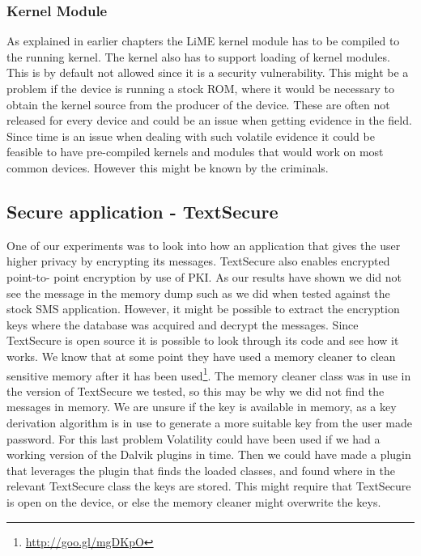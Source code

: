 \subsubsection{Kernel Module}
As explained in earlier chapters the LiME kernel module has to be compiled to the 
running kernel. The kernel also has to support loading of kernel modules. This is 
by default not allowed since it is a security vulnerability. This might be a 
problem if the device is running a stock ROM, where it would be necessary to obtain 
the kernel source from the producer of the device. These are often not released for 
every device and could be an issue when getting evidence in the field. Since time is 
an issue when dealing with such volatile evidence it could be feasible to have 
pre-compiled kernels and modules that would work on most common devices. However 
this might be known by the criminals. %

\subsection{Secure application - TextSecure}
One of our experiments was to look into how an application that gives the user higher 
privacy by encrypting its messages. TextSecure also enables encrypted point-to-
point encryption by use of PKI. As our results have shown we did not see the 
message in the memory dump such as we did when tested against the stock SMS application. 
However, it might be possible to extract the encryption keys where the database was 
acquired and decrypt the messages. Since TextSecure is open source it is
possible to look through its code and see how it works. We know that at some
point they have used a memory cleaner to clean sensitive memory after it has
been used\footnote{\url{http://goo.gl/mgDKpO}}.
The memory cleaner class was in use in the version of TextSecure we tested, so
this may be why we did not find the messages in memory. We are unsure if the
key is available in memory, as a key derivation algorithm is in use to
generate a more suitable key from the user made password. For this last
problem Volatility could have been used if we had a working version of the
Dalvik plugins in time. Then we could have made a plugin that leverages the
plugin that finds the loaded classes, and found where in the relevant
TextSecure class the keys are stored. This might require that TextSecure is
open on the device, or else the memory cleaner might overwrite the keys.

